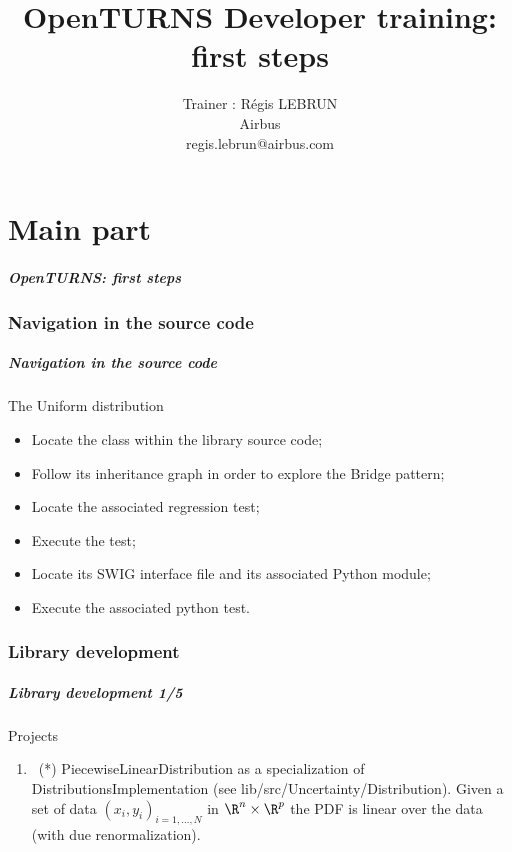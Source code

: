 \documentclass[8pt]{beamer}
\title[OpenTURNS Developer training]{OpenTURNS Developer training: first steps}
\author[OpenTURNS Consortium, 2025]
{
  Trainer : R\'egis LEBRUN\\
  Airbus \\
  regis.lebrun@airbus.com
}
\date[1-3 April 2025]
{
  Developers training \\

  \begin{center}
    \texttt{[image: logoOT.jpg]}
  \end{center}
}
\begin{document}
\frame{\titlepage}

\part{Main part}

\begin{frame}
  \frametitle{OpenTURNS: first steps}
  \tableofcontents[part=1]
\end{frame}

\section{Navigation in the source code}

\begin{frame}
  \frametitle{Navigation in the source code}
  \begin{block}{The Uniform distribution}
    \begin{itemize}
    \item Locate the class within the library source code;
    \item Follow its inheritance graph in order to explore the Bridge pattern;
    \item Locate the associated regression test;
    \item Execute the test;
    \item Locate its SWIG interface file and its associated Python module;
    \item Execute the associated python test.
    \end{itemize}
  \end{block}
\end{frame}


\section{Library development}

\begin{frame}
  \frametitle{Library development 1/5}
  \begin{block}{Projects}
    \begin{enumerate}
      \item~(*) \alert{\ttfamily PiecewiseLinearDistribution} as a specialization of \alert{\ttfamily DistributionsImplementation} (see {\ttfamily lib/src/Uncertainty/Distribution}). Given a set of data $(x_i, y_i)_{i=1,\dots,N}$ in $\R^n\times\R^p$
      the PDF is linear over the data (with due renormalization).
    \end{enumerate}
  \end{block}
\end{frame}
\end{document}
